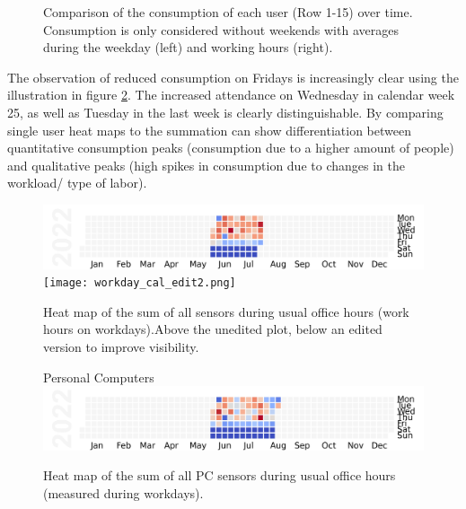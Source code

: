 \begin{figure}[ht]
    \newline
    \newline
    \caption{\centering Comparison of the consumption of each user (Row 1-15) over time. Consumption is only considered without weekends with averages during the weekday (left) and working hours (right).}
    \label{fig:user_comparison}
\end{figure}
\noindent The observation of reduced consumption on Fridays is increasingly clear using the illustration in figure \ref{fig:office_consumption}. The increased attendance on Wednesday in calendar week 25, as well as Tuesday in the last week is clearly distinguishable. By comparing single user heat maps to the summation can show differentiation between quantitative consumption peaks (consumption due to a higher amount of people) and qualitative peaks (high spikes in consumption due to changes in the workload/ type of labor).
\begin{figure}[ht]
	\centering
	\includegraphics[width=\textwidth]{images/heatmaps/workday_cal.png}
	\texttt{[image: workday\_cal\_edit2.png]}
	\caption{Heat map of the sum of all sensors during usual office hours (work hours on \glspl{workday}).Above the unedited plot, below an edited version to improve visibility.}
	\label{fig:office_consumption}
\end{figure}
\begin{figure}[ht]
	\centering
	Personal Computers
	\includegraphics[width=\textwidth]{images/heatmaps/devicetype_PC_workday_cal.png}
	\caption{Heat map of the sum of all PC sensors during usual office hours (measured during \glspl{workday}).}
	\label{fig:pc_hm}
\end{figure}
